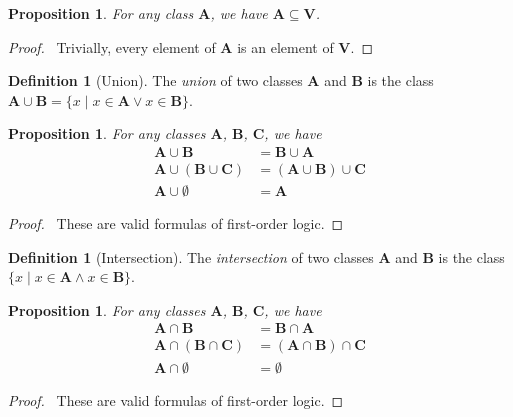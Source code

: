 \documentclass{book}
\let\qed\relax
\newtheorem{prop}[ax]{Proposition}
\theoremstyle{definition}
\newtheorem{df}[ax]{Definition}
\begin{document}
\begin{prop}
For any class $\mathbf{A}$, we have $\mathbf{A} \subseteq \mathbf{V}$.
\end{prop}

\begin{proof}
\pf\ Trivially, every element of $\mathbf{A}$ is an element of $\mathbf{V}$. \qed	
\end{proof}

\begin{df}[Union]
The \emph{union} of two classes $\mathbf{A}$ and $\mathbf{B}$ is the class $\mathbf{A} \cup \mathbf{B} = \{x \mid x \in \mathbf{A} \vee x \in \mathbf{B} \}$.
\end{df}

\begin{prop}
For any classes $\mathbf{A}$, $\mathbf{B}$, $\mathbf{C}$, we have
\begin{align*}
\mathbf{A} \cup \mathbf{B} & = \mathbf{B} \cup \mathbf{A} \\
\mathbf{A} \cup (\mathbf{B} \cup \mathbf{C}) & = (\mathbf{A} \cup \mathbf{B}) \cup \mathbf{C} \\
\mathbf{A} \cup \emptyset & = \mathbf{A}
\end{align*}
\end{prop}

\begin{proof}
\pf\ These are valid formulas of first-order logic. \qed
\end{proof}

\begin{df}[Intersection]
The \emph{intersection} of two classes $\mathbf{A}$ and $\mathbf{B}$ is the class $\{ x \mid x \in \mathbf{A} \wedge x \in \mathbf{B}\}$.
\end{df}

\begin{prop}
For any classes $\mathbf{A}$, $\mathbf{B}$, $\mathbf{C}$, we have
\begin{align*}
\mathbf{A} \cap \mathbf{B} & = \mathbf{B} \cap \mathbf{A} \\
\mathbf{A} \cap (\mathbf{B} \cap \mathbf{C}) & = (\mathbf{A} \cap \mathbf{B}) \cap \mathbf{C} \\
\mathbf{A} \cap \emptyset & = \emptyset
\end{align*}
\end{prop}

\begin{proof}
\pf\ These are valid formulas of first-order logic. \qed
\end{proof}
\end{document}
